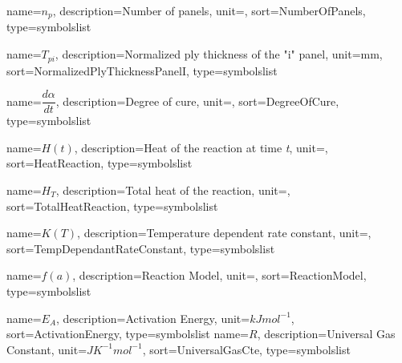  {
	name=\ensuremath{n_{p}},
	description={Number of panels},
	unit={},
	sort=NumberOfPanels,
	type=symbolslist
}

 {
	name=\ensuremath{T_{pi}},
	description={Normalized ply thickness of the "i" panel},
	unit={mm},
	sort=NormalizedPlyThicknessPanelI,
	type=symbolslist
}

 {
	name=\ensuremath{\dfrac{d\alpha}{dt}},
	description={Degree of cure},
	unit={},
	sort=DegreeOfCure,
	type=symbolslist
}

 {
	name=\ensuremath{H(t)},
	description={Heat of the reaction at time \textit{t}},
	unit={},
	sort=HeatReaction,
	type=symbolslist
}

 {
	name=\ensuremath{H_{T}},
	description={Total heat of the reaction},
	unit={},
	sort=TotalHeatReaction,
	type=symbolslist
}

 {
	name=\ensuremath{K(T)},
	description={Temperature dependent rate constant},
	unit={},
	sort=TempDependantRateConstant,
	type=symbolslist
}

 {
	name=\ensuremath{f(a)},
	description={Reaction Model},
	unit={},
	sort=ReactionModel,
	type=symbolslist
}

 {
	name=\ensuremath{E_{A}},
	description={Activation Energy},
	unit=\ensuremath{kJ mol^{-1}},
	sort=ActivationEnergy,
	type=symbolslist
}
 {
	name=\ensuremath{R},
	description={Universal Gas Constant},
	unit=\ensuremath{J K^{-1} mol^{-1}},
	sort=UniversalGasCte,
	type=symbolslist
}